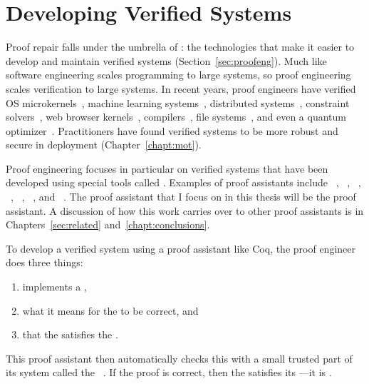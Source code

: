 \section{Developing Verified Systems}
\label{sec:dev-verif}

Proof repair falls under the umbrella of : the technologies that make it easier
to develop and maintain verified systems (Section~\ref{sec:proofeng}).
Much like software engineering scales programming to large systems, so proof engineering scales verification to large systems. 
In recent years, proof engineers have verified OS microkernels~\cite{Klein2009, Klein2014micro}, machine learning systems~\cite{pmlr-v70-selsam17a}, distributed systems~\cite{Woos:2016:PCF:2854065.2854081}, constraint solvers~\cite{blanchette2018verified}, web browser kernels~\cite{Jang2012}, compilers~\cite{Leroy:POPL06, Leroy2009, Kumar2014}, file systems~\cite{Chajed2019, Chen2015, Chajed2017}, and even a quantum optimizer~\cite{hietala2021verified}.
Practitioners have found verified systems to be more robust and secure in deployment (Chapter~\ref{chapt:mot}).

Proof engineering focuses in particular on verified systems that have been
developed using special tools called .
Examples of proof assistants include ~\cite{coq}, ~\cite{isabelle}, ~\cite{hollight}, ~\cite{hol4-interact},
~\cite{agda}, ~\cite{lean}, and ~\cite{nuprl}.
The proof assistant that I focus on in this thesis will be the  proof assistant.
A discussion of how this work carries over to other proof assistants is in Chapters~\ref{sec:related} and~\ref{chapt:conclusions}.

To develop a verified system using a proof assistant like Coq, the proof engineer does three things:

\begin{enumerate}
\item implements a ,
\item {} what it means for the  to be correct, and
\item {} that the  satisfies the .
\end{enumerate}
This proof assistant then automatically checks this  with a small trusted part of its system
called the ~\cite{Barendregt2002,Barendregt2351}.
If the proof is correct, then the  satisfies its ---it is .


